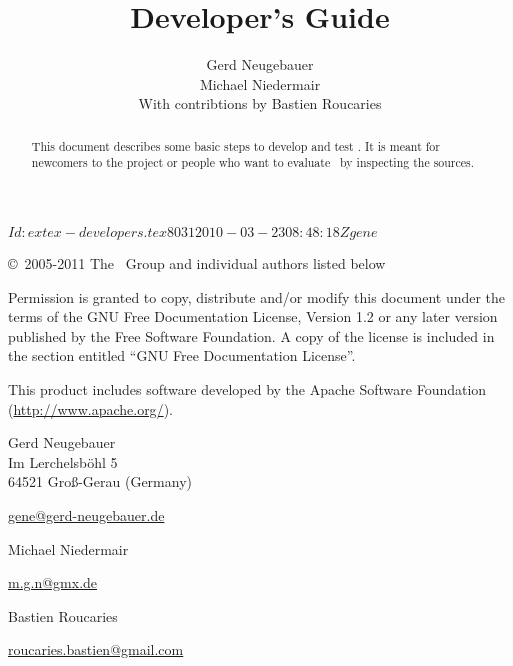 \documentclass{extex-doc}
\begin{document}
\SVN$Id: extex-developers.tex 8031 2010-03-23 08:48:18Z gene $

\begin{titlepage}\parindent=0pt

  \title{Developer's Guide}
  \author{Gerd Neugebauer\\[1ex]%
    Michael Niedermair\\[1ex]%
    With contribtions by Bastien Roucaries}
  \maketitle

  \begin{center}
    \begin{abstract}\noindent
      This document describes some basic steps to develop and test
      \ExTeX.  It is meant for newcomers to the project or people who
      want to evaluate \ExTeX\ by inspecting the sources.
    \end{abstract}
  \end{center}
  \newpage
  \footnotesize
  \copyright\ 2005-2011 The \ExTeX\ Group and individual authors listed below
  \medskip

Permission is granted to copy, distribute and/or modify this document
under the terms of the GNU Free Documentation License, Version 1.2 or
any later version published by the Free Software Foundation. A copy of
the license is included in the section entitled ``GNU Free
Documentation License''.
\bigskip

This product includes software developed by the Apache Software
Foundation (\url{http://www.apache.org/}).

\vfill

Gerd Neugebauer\\
Im Lerchelsb\"ohl 5\\
64521 Gro\ss-Gerau (Germany)
\smallskip\par
\href{mailto://gene@gerd-neugebauer.de}{gene@gerd-neugebauer.de}
\bigskip

Michael Niedermair
\smallskip\par
\href{mailto://m.g.n@gmx.de}{m.g.n@gmx.de}
\bigskip

Bastien Roucaries
\smallskip\par
\href{mailto://roucaries.bastien@gmail.com}{roucaries.bastien@gmail.com}

\end{titlepage}
\end{document}
